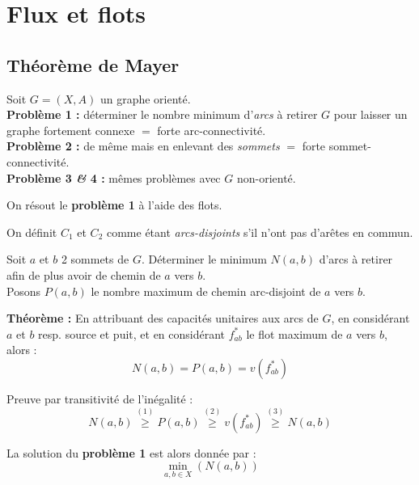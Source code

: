 \documentclass[a4paper, 8pt]{article}
\begin{document}
\begin{multicols*}{3}
\begin{center}
\end{center}

\section*{Flux et flots}

\subsection*{Théorème de Mayer}
Soit $G = (X,A)$ un graphe orienté.\\
\textbf{Problème 1 :} déterminer le nombre minimum d'\textit{arcs} à retirer $G$ pour laisser un graphe fortement connexe $=$ forte arc-connectivité.\\
\textbf{Problème 2 :} de même mais en enlevant des \textit{sommets} $=$ forte sommet-connectivité.\\
\textbf{Problème 3 \textit{\&} 4 :} mêmes problèmes avec $G$ non-orienté.

On résout le \textbf{problème 1} à l'aide des flots.

On définit $C_1$ et $C_2$ comme étant \emph{arcs-disjoints} s'il n'ont pas d'arêtes en commun.

\underline{}Soit $a$ et $b$ 2 sommets de $G$. Déterminer le minimum $N(a,b)$ d'arcs à retirer afin de plus avoir de chemin de $a$ vers $b$.\\
Posons $P(a,b)$ le nombre maximum de chemin arc-disjoint de $a$ vers $b$.

\smallskip
\textbf{Théorème :} En attribuant des capacités unitaires aux arcs de $G$, en considérant $a$ et $b$ resp. source et puit, et en considérant $f^*_{ab}$ le flot maximum de $a$ vers $b$, alors :
\[ N(a,b) = P(a,b) = v(f^*_{ab}) \]

Preuve par transitivité de l'inégalité :
\[ N(a,b) \overset{(1)}{\geqslant} P(a,b) \overset{(2)}{\geqslant} v(f^*_{ab}) \overset{(3)}{\geqslant} N(a,b)\]

La solution du \textbf{problème 1} est alors donnée par :
\[ \displaystyle \min_{a,b\in X}\left(N(a,b)\right) \]


\end{multicols*}
\end{document}
